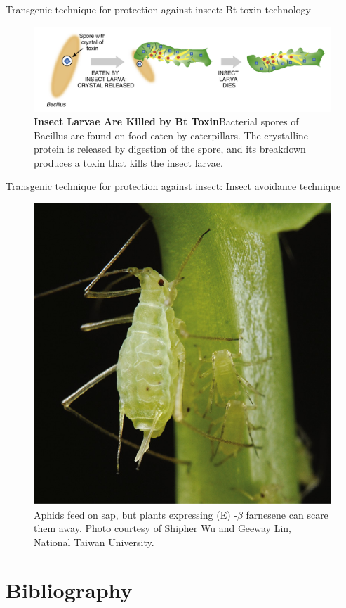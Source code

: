 \documentclass[ignorenonframetext,aspectratio=169]{beamer}
\begin{document}
\begin{frame}{Transgenic technique for protection against insect:
Bt-toxin technology}
\protect\hypertarget{transgenic-technique-for-protection-against-insect-bt-toxin-technology}{}

\begin{figure}
\includegraphics[width=0.6\linewidth]{../images/bt_toxin_mechanism} \caption{\textbf{Insect Larvae Are Killed by Bt Toxin}Bacterial spores of Bacillus are found on food eaten by caterpillars. The crystalline protein is released by digestion of the spore, and its breakdown produces a toxin that kills the insect larvae.}\label{fig:bt-toxin-mechanism}
\end{figure}

\end{frame}

\begin{frame}{Transgenic technique for protection against insect: Insect
avoidance technique}
\protect\hypertarget{transgenic-technique-for-protection-against-insect-insect-avoidance-technique}{}

\begin{figure}
\includegraphics[width=0.4\linewidth]{../images/aphid_avoidance} \caption{Aphids feed on sap, but plants expressing (E) -$\beta$ farnesene can scare them away. Photo courtesy of Shipher Wu and Geeway Lin, National Taiwan University.}\label{fig:aphid-avoidance}
\end{figure}

\end{frame}

\hypertarget{bibliography}{%
\section{Bibliography}\label{bibliography}}
\end{document}
